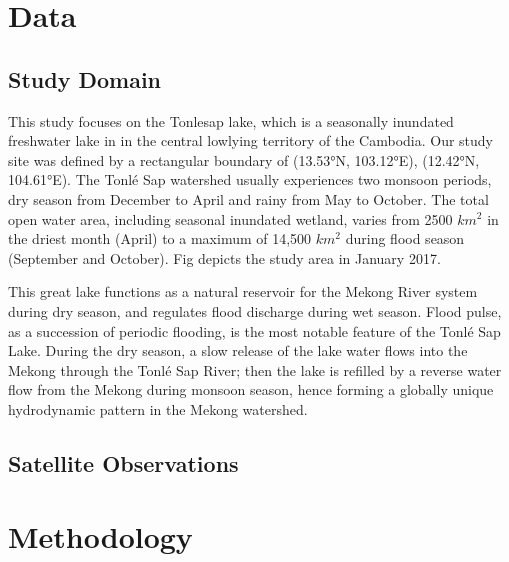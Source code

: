 \section{Data}
\subsection{Study Domain}
This study focuses on the Tonlesap lake, which is a seasonally inundated freshwater lake in in the central lowlying territory of the Cambodia. Our study site was defined by a rectangular boundary of (13.53°N, 103.12°E), (12.42°N, 104.61°E). The Tonlé Sap watershed usually experiences two
monsoon periods, dry season from December to April and rainy from
May to October. %
The total open water area, including seasonal inundated wetland, varies from 2500 $km^2$ in the driest month (April) to a maximum of 14,500 $km^2$ during flood season (September and October). Fig %
depicts the study area in January 2017.

This great lake functions as a natural reservoir for the Mekong River
system during dry season, and regulates flood discharge during wet
season. Flood pulse, as a succession of periodic flooding, is the most
notable feature of the Tonlé Sap Lake. During the dry season, a slow
release of the lake water flows into the Mekong through the Tonlé Sap
River; then the lake is refilled by a reverse water flow from the Mekong
during monsoon season, hence forming a globally unique hydrodynamic pattern in the Mekong watershed. %

\subsection{Satellite Observations}
\label{subsection-used-data}
% 

%

\section{Methodology}

